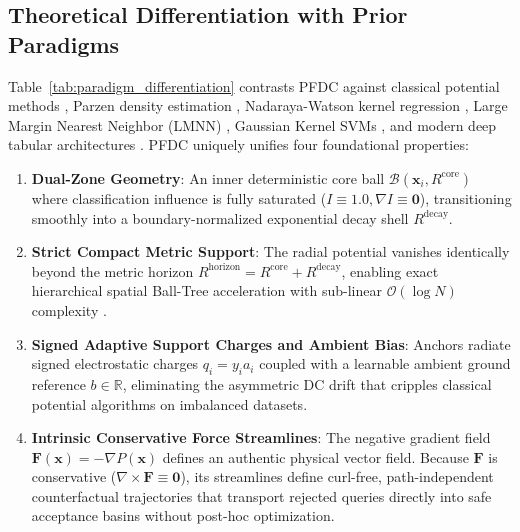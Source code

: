 \documentclass[times, review, 10pt]{elsarticle}
\begin{document}
\subsection{Theoretical Differentiation with Prior Paradigms}
Table~\ref{tab:paradigm_differentiation} contrasts PFDC against classical potential methods \cite{aizerman1964theoretical}, Parzen density estimation \cite{parzen1962estimation}, Nadaraya-Watson kernel regression \cite{nadaraya1964estimating}, Large Margin Nearest Neighbor (LMNN) \cite{weinberger2009distance}, Gaussian Kernel SVMs \cite{cortes1995support}, and modern deep tabular architectures \cite{arik2021tabnet,gorishniy2021revisiting}. PFDC uniquely unifies four foundational properties:
\begin{enumerate}
    \item \textbf{Dual-Zone Geometry}: An inner deterministic core ball $\mathcal{B}(\mathbf{x}_i, R^{\mathrm{core}})$ where classification influence is fully saturated ($I \equiv 1.0, \nabla I \equiv \mathbf{0}$), transitioning smoothly into a boundary-normalized exponential decay shell $R^{\mathrm{decay}}$.
    \item \textbf{Strict Compact Metric Support}: The radial potential vanishes identically beyond the metric horizon $R^{\mathrm{horizon}} = R^{\mathrm{core}} + R^{\mathrm{decay}}$, enabling exact hierarchical spatial Ball-Tree acceleration with sub-linear $\mathcal{O}(\log N)$ complexity \cite{omohundro1989five}.
    \item \textbf{Signed Adaptive Support Charges and Ambient Bias}: Anchors radiate signed electrostatic charges $q_i = y_i a_i$ coupled with a learnable ambient ground reference $b \in \mathbb{R}$, eliminating the asymmetric DC drift that cripples classical potential algorithms on imbalanced datasets.
    \item \textbf{Intrinsic Conservative Force Streamlines}: The negative gradient field $\mathbf{F}(\mathbf{x}) = -\nabla P(\mathbf{x})$ defines an authentic physical vector field. Because $\mathbf{F}$ is conservative ($\nabla \times \mathbf{F} \equiv \mathbf{0}$), its streamlines define curl-free, path-independent counterfactual trajectories that transport rejected queries directly into safe acceptance basins without post-hoc optimization.
\end{enumerate}
\end{document}
